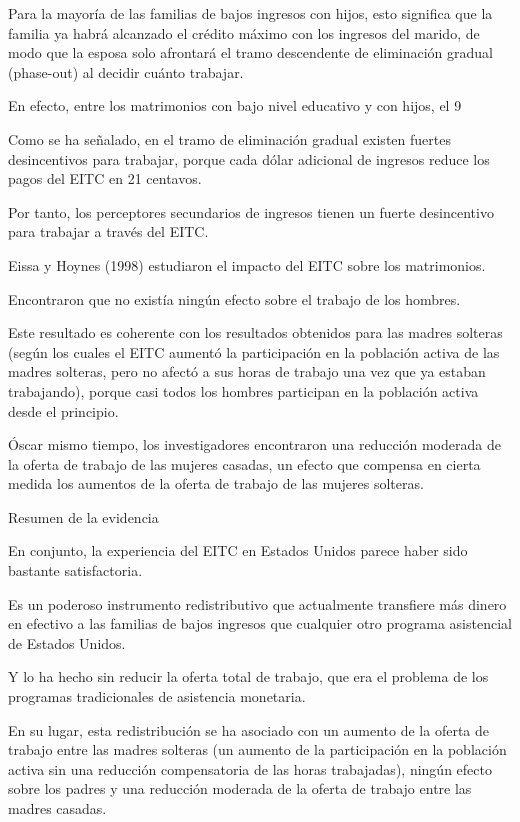 \documentclass[10pt,a4paper]{article}
\begin{document}
Para la mayoría de las familias de bajos ingresos con hijos, esto significa que la familia ya habrá alcanzado el crédito máximo con los ingresos del marido, de modo que la esposa solo afrontará el tramo descendente de eliminación gradual (phase-out) al decidir cuánto trabajar.

En efecto, entre los matrimonios con bajo nivel educativo y con hijos, el 9 %

Como se ha señalado, en el tramo de eliminación gradual existen fuertes desincentivos para trabajar, porque cada dólar adicional de ingresos reduce los pagos del EITC en 21 centavos.

Por tanto, los perceptores secundarios de ingresos tienen un fuerte desincentivo para trabajar a través del EITC.

Eissa y Hoynes (1998) estudiaron el impacto del EITC sobre los matrimonios.

Encontraron que no existía ningún efecto sobre el trabajo de los hombres.

Este resultado es coherente con los resultados obtenidos para las madres solteras (según los cuales el EITC aumentó la participación en la población activa de las madres solteras, pero no afectó a sus horas de trabajo una vez que ya estaban trabajando), porque casi todos los hombres participan en la población activa desde el principio.

Óscar mismo tiempo, los investigadores encontraron una reducción moderada de la oferta de trabajo de las mujeres casadas, un efecto que compensa en cierta medida los aumentos de la oferta de trabajo de las mujeres solteras.

Resumen de la evidencia

En conjunto, la experiencia del EITC en Estados Unidos parece haber sido bastante satisfactoria.

Es un poderoso instrumento redistributivo que actualmente transfiere más dinero en efectivo a las familias de bajos ingresos que cualquier otro programa asistencial de Estados Unidos.

Y lo ha hecho sin reducir la oferta total de trabajo, que era el problema de los programas tradicionales de asistencia monetaria.

En su lugar, esta redistribución se ha asociado con un aumento de la oferta de trabajo entre las madres solteras (un aumento de la participación en la población activa sin una reducción compensatoria de las horas trabajadas), ningún efecto sobre los padres y una reducción moderada de la oferta de trabajo entre las madres casadas.
\end{document}
